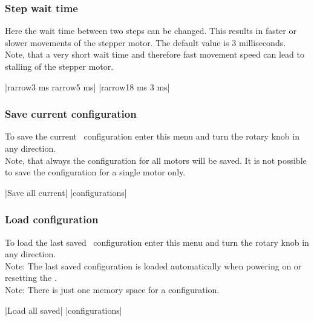 \subsubsection{Step wait time}
\label{menu_step_wait_time}
Here the wait time between two steps can be changed. This results in faster or slower movements of the stepper motor. The default value is 3 milliseconds.\\
Note, that a very short wait time and therefore fast movement speed can lead to stalling of the stepper motor.
\begin{center}
  |{rarrow}3 ms   {rarrow}5 ms|
             |{rarrow}18 ms   3 ms|
\end{center}

\subsubsection{Save current configuration}
\label{menu_save}
To save the current \productName ~configuration enter this menu and turn the rotary knob in any direction.\\
Note, that always the configuration for all motors will be saved. It is not possible to save the configuration for a single motor only.
\begin{center}
  |Save all current|
             |configurations|
\end{center}


\subsubsection{Load configuration}
\label{chp:menu_load}
To load the last saved \productName ~configuration enter this menu and turn the rotary knob in any direction.\\
Note: The last saved configuration is loaded automatically when powering on or resetting the \productName.\\
Note: There is just one memory space for a configuration.
\begin{center}
  |Load all saved|
             |configurations|
\end{center}








